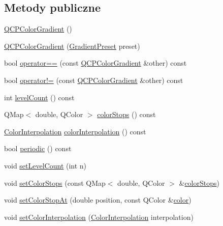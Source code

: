 \subsection*{Metody publiczne}
\begin{DoxyCompactItemize}
\item 
\hyperlink{class_q_c_p_color_gradient_a96bcc490ff9dc32b22941ce00800bce0}{Q\+C\+P\+Color\+Gradient} ()
\item 
\hyperlink{class_q_c_p_color_gradient_a4e570b4004fd60bd135e52d685ed2b66}{Q\+C\+P\+Color\+Gradient} (\hyperlink{class_q_c_p_color_gradient_aed6569828fee337023670272910c9072}{Gradient\+Preset} preset)
\item 
bool \hyperlink{class_q_c_p_color_gradient_aada47d8206bf2cec77462653bf471c13}{operator==} (const \hyperlink{class_q_c_p_color_gradient}{Q\+C\+P\+Color\+Gradient} \&other) const 
\item 
bool \hyperlink{class_q_c_p_color_gradient_ac641f5d2dc1686201d3cb602c871791d}{operator!=} (const \hyperlink{class_q_c_p_color_gradient}{Q\+C\+P\+Color\+Gradient} \&other) const 
\item 
int \hyperlink{class_q_c_p_color_gradient_ae7537a8e6d0fed3f1928328062bb0f4e}{level\+Count} () const 
\item 
Q\+Map$<$ double, Q\+Color $>$ \hyperlink{class_q_c_p_color_gradient_a64f8aba7826f9c6363aacff8376cef37}{color\+Stops} () const 
\item 
\hyperlink{class_q_c_p_color_gradient_ac5dca17cc24336e6ca176610e7f77fc1}{Color\+Interpolation} \hyperlink{class_q_c_p_color_gradient_a731616fabe6f2e33f71f58dd382359d8}{color\+Interpolation} () const 
\item 
bool \hyperlink{class_q_c_p_color_gradient_a860b7048f877195d2a0fb8d5a7cf5d73}{periodic} () const 
\item 
void \hyperlink{class_q_c_p_color_gradient_a18da587eb4f7fc788ea28ba15b6a12de}{set\+Level\+Count} (int n)
\item 
void \hyperlink{class_q_c_p_color_gradient_a724e828aa6f0ba5011a9392477c35d3a}{set\+Color\+Stops} (const Q\+Map$<$ double, Q\+Color $>$ \&\hyperlink{class_q_c_p_color_gradient_a64f8aba7826f9c6363aacff8376cef37}{color\+Stops})
\item 
void \hyperlink{class_q_c_p_color_gradient_a3b48be5e78079db1bb2a1188a4c3390e}{set\+Color\+Stop\+At} (double position, const Q\+Color \&\hyperlink{class_q_c_p_color_gradient_a0599545c859268b025d2060dea741cea}{color})
\item 
void \hyperlink{class_q_c_p_color_gradient_aa13fda86406e1d896a465a409ae63b38}{set\+Color\+Interpolation} (\hyperlink{class_q_c_p_color_gradient_ac5dca17cc24336e6ca176610e7f77fc1}{Color\+Interpolation} interpolation)

\end{DoxyCompactItemize}

